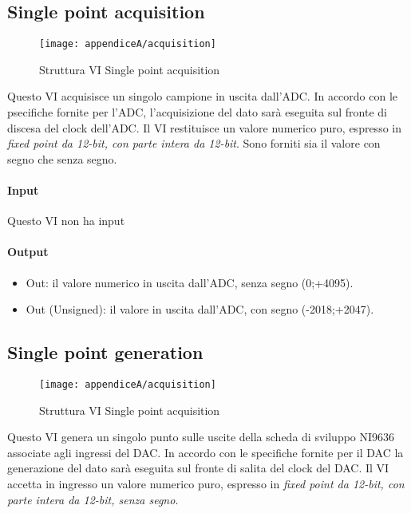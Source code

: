 \subsection*{Single point acquisition}

\begin{figure}[H]  
	\begin{center}
		\texttt{[image: appendiceA/acquisition]}
		\caption{Struttura VI Single point acquisition}
	\end{center}
\end{figure}

Questo VI acquisisce un singolo campione in uscita dall'ADC. In accordo con le psecifiche fornite per l'ADC, l'acquisizione del dato sarà eseguita sul fronte di discesa del clock dell'ADC.
Il VI restituisce un valore numerico puro, espresso in \textit{fixed point da 12-bit, con parte intera da 12-bit}. Sono forniti sia il valore con segno che senza segno.

\paragraph*{Input}
Questo VI non ha input

\paragraph*{Output}
\begin{itemize}
	\item Out: il valore numerico in uscita dall'ADC, senza segno (0;+4095).
	\item Out (Unsigned): il valore in uscita dall'ADC, con segno (-2018;+2047).
\end{itemize}

\subsection*{Single point generation}

\begin{figure}[H]  
	\begin{center}
		\texttt{[image: appendiceA/acquisition]}
		\caption{Struttura VI Single point acquisition}
	\end{center}
\end{figure}

Questo VI genera un singolo punto sulle uscite della scheda di sviluppo NI9636 associate agli ingressi del DAC. In accordo con le specifiche fornite per il DAC la generazione del dato sarà eseguita sul fronte di salita del clock del DAC. Il VI accetta in ingresso un valore numerico puro, espresso in \textit{fixed point da 12-bit, con parte intera da 12-bit, senza segno}.
